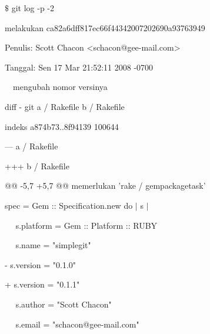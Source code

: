 \noindent 
 \hspace*{0.5in}  $  \$  $ git log -p -2 \par
\noindent 
 \hspace*{0.5in} melakukan ca82a6dff817ec66f44342007202690a93763949 \par
\noindent 
 \hspace*{0.5in} Penulis: Scott Chacon <schacon@gee-mail.com> \par
\noindent 
 \hspace*{0.5in} Tanggal: Sen 17 Mar 21:52:11 2008 -0700 \par
\noindent 
 \hspace*{0.5in}  $  $ $  $ $  $ $  $mengubah nomor versinya \par
\noindent 
 \hspace*{0.5in} diff - git a / Rakefile b / Rakefile \par
\noindent 
 \hspace*{0.5in} indeks a874b73..8f94139 100644 \par
\noindent 
 \hspace*{0.5in} --- a / Rakefile \par
\noindent 
 \hspace*{0.5in} +++ b / Rakefile \par
\noindent 
 \hspace*{0.5in} @@ -5,7 +5,7 @@ memerlukan 'rake / gempackagetask' \par
\noindent 
 \hspace*{0.5in}  $  $spec = Gem :: Specification.new do  $  \vert  $ s  $  \vert  $ \par
\noindent 
 \hspace*{0.5in}  $  $ $  $ $  $ $  $ $  $s.platform = Gem :: Platform :: RUBY \par
\noindent 
 \hspace*{0.5in}  $  $ $  $ $  $ $  $ $  $s.name = "simplegit" \par
\noindent 
 \hspace*{0.5in} - s.version = "0.1.0" \par
\noindent 
 \hspace*{0.5in} + s.version = "0.1.1" \par
\noindent 
 \hspace*{0.5in}  $  $ $  $ $  $ $  $ $  $s.author = "Scott Chacon" \par
\noindent 
 \hspace*{0.5in}  $  $ $  $ $  $ $  $ $  $s.email = "schacon@gee-mail.com" \par
